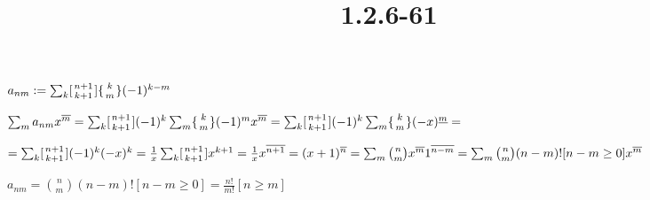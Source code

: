 \documentclass{article}
\title{1.2.6-61}
\begin{document}
\maketitle

\( a_{nm} := \sum_k [{{n+1} \atop {k+1}}] \{{k \atop m}\} (-1)^{k-m} \)

\( \sum_m a_{nm} x^{\overline{m}} = \sum_k [{{n+1} \atop {k+1}}](-1)^k \sum_m \{{k \atop m}\} (-1)^{m} x^{\overline{m}} = \sum_k [{{n+1} \atop {k+1}}](-1)^k \sum_m \{{k \atop m}\} (-x)^{\underline{m}} = \)

\( = \sum_k [{{n+1} \atop {k+1}}](-1)^k (-x)^k = \frac{1}{x} \sum_k [{{n+1} \atop {k+1}}]x^{k+1} = \frac{1}{x} x^{\overline{n+1}} = (x+1)^{\overline{n}} = \sum_{m} \binom{n}{m} x^{\overline{m}}1^{\overline{n-m}} = \sum_m \binom{n}{m}(n-m)![n-m \geq 0] x^{\overline{m}} \)

\( a_{nm} = \binom{n}{m}(n-m)![n-m \geq 0] = \frac{n!}{m!} [n \geq m] \)
\end{document}
